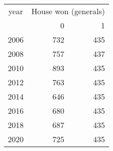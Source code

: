 \footnotesize\begin{tabular}[t]{lrr}
\toprule
\multicolumn{1}{c}{year} & \multicolumn{2}{c}{House won (generals)} \\
\cmidrule(l{3pt}r{3pt}){1-1} \cmidrule(l{3pt}r{3pt}){2-3}
  & 0 & 1\\
\midrule
2006 & 732 & 435\\
2008 & 757 & 437\\
2010 & 893 & 435\\
2012 & 763 & 435\\
2014 & 646 & 435\\
2016 & 680 & 435\\
2018 & 687 & 435\\
2020 & 725 & 435\\
\bottomrule
\end{tabular}

